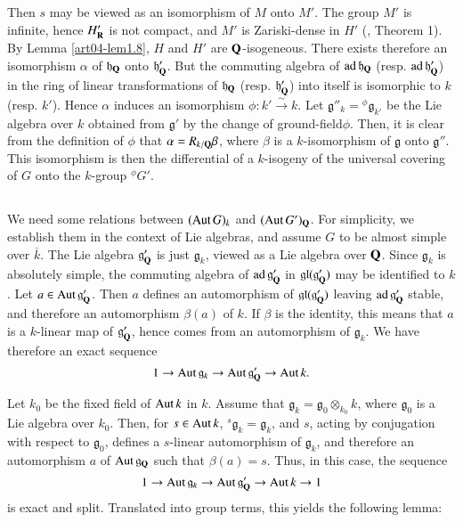 Then $s$ may be viewed as an isomorphism of $M$ onto $M'$. The group $M'$ is infinite, hence $H'_{\mathbf{R}}$ is not compact, and $M'$ is Zariski-dense in $H'$ (\cite{art04-key6}, Theorem 1). By Lemma \ref{art04-lem1.8}, $H$ and $H'$ are $\mathbf{Q}$-isogeneous. There exists therefore an isomorphism $\alpha$ of $\mathfrak{h}_{\mathbf{Q}}$ onto $\mathfrak{h}'_{\mathbf{Q}}$. But the commuting algebra of $\operatorname{\mathrm{ad}}\mathfrak{h}_{\mathbf{Q}}$ (resp. $\operatorname{\mathrm{ad}}\mathfrak{h}'_{\mathbf{Q}}$) in the ring of linear transformations of $\mathfrak{h}_{\mathbf{Q}}$ (resp. $\mathfrak{h}'_{\mathbf{Q}}$) into itself is isomorphic to $k$ (resp. $k'$). Hence $\alpha$ induces an isomorphism $\phi:k'\xrightarrow{\sim}k$. Let $\mathfrak{g}''_{k}={}^{\phi}\mathfrak{g}_{k'}$ be the Lie algebra over $k$ obtained from $\mathfrak{g}'$ by the change of ground-field\pageoriginale $\phi$. Then, it is clear from the definition of $\phi$ that $\alpha=R_{k/\mathbf{Q}}\beta$, where $\beta$ is a $k$-isomorphism of $\mathfrak{g}$ onto $\mathfrak{g}''$. This isomorphism is then the differential of a $k$-isogeny of the universal covering of $G$ onto the $k$-group ${}^{\phi}G'$.

\setcounter{subsection}{7}
\subsection{}\label{art04-sec3.8} 
We need some relations between $(\operatorname{\mathrm{Aut}} G)_{k}$ and $(\operatorname{\mathrm{Aut}} G')_{\mathbf{Q}}$. For simplicity, we establish them in the context of Lie algebras, and assume $G$ to be almost simple over $\overline{k}$. The Lie algebra $\mathfrak{g}'_{\mathbf{Q}}$ is just $\mathfrak{g}_{k}$, viewed as a Lie algebra over $\mathbf{Q}$. Since $\mathfrak{g}_{k}$ is absolutely simple, the commuting algebra of $\operatorname{\mathrm{ad}}\mathfrak{g}'_{\mathbf{Q}}$ in $\mathfrak{gl}(\mathfrak{g}'_{\mathbf{Q}})$ may be identified to $k$. Let $a\in \operatorname{\mathrm{Aut}} \mathfrak{g}'_{\mathbf{Q}}$. Then $a$ defines an automorphism of $\mathfrak{gl}(\mathfrak{g}'_{\mathbf{Q}})$ leaving $\operatorname{\mathrm{ad}}\mathfrak{g}'_{\mathbf{Q}}$ stable, and therefore an automorphism $\beta(a)$ of $k$. If $\beta$ is the identity, this means that $a$ is a $k$-linear map of $\mathfrak{g}'_{\mathbf{Q}}$, hence comes from an automorphism of $\mathfrak{g}_{k}$. We have therefore an exact sequence
\setcounter{equation}{0}
\begin{equation}
1\to \operatorname{\mathrm{Aut}} \mathfrak{g}_{k}\to \operatorname{\mathrm{Aut}} \mathfrak{g}'_{\mathbf{Q}}\to \operatorname{\mathrm{Aut}} k.\label{art04-sec3.8-eq1}
\end{equation}

Let $k_{0}$ be the fixed field of $\operatorname{\mathrm{Aut}} k$ in $k$. Assume that $\mathfrak{g}_{k}=\mathfrak{g}_{0}\otimes_{k_{0}}k$, where $\mathfrak{g}_{0}$ is a Lie algebra over $k_{0}$. Then, for $s\in \operatorname{\mathrm{Aut}} k$, ${}^{s}\mathfrak{g}_{k}=\mathfrak{g}_{k}$, and $s$, acting by conjugation with respect to $\mathfrak{g}_{0}$, defines a $s$-linear automorphism of $\mathfrak{g}_{k}$, and therefore an automorphism $a$ of $\operatorname{\mathrm{Aut}} \mathfrak{g}_{\mathbf{Q}}$ such that $\beta(a)=s$. Thus, in this case, the sequence
\begin{equation}
1\to \operatorname{\mathrm{Aut}} \mathfrak{g}_{k}\to \operatorname{\mathrm{Aut}} \mathfrak{g}'_{\mathbf{Q}}\to \operatorname{\mathrm{Aut}} k\to 1\label{art04-sec3.8-eq2}
\end{equation}
is exact and split. Translated into group terms, this yields the following lemma:

